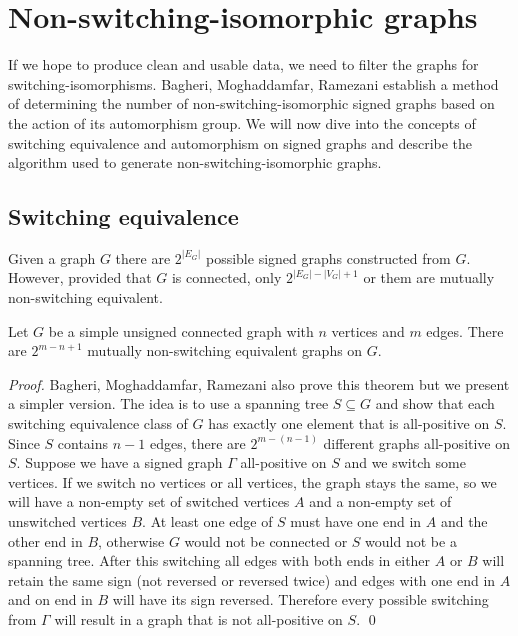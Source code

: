 \chapter{Non-switching-isomorphic graphs}

If we hope to produce clean and usable data, we need to filter the graphs for switching-isomorphisms. Bagheri, Moghaddamfar, Ramezani\cite{switching-isomorphic} establish a method of determining the number of non-switching-isomorphic signed graphs based on the action of its automorphism group. We will now dive into the concepts of switching equivalence and automorphism on signed graphs and describe the algorithm used to generate non-switching-isomorphic graphs.

\section{Switching equivalence}

Given a graph $G$ there are $2^{|E_G|}$ possible signed graphs constructed from $G$. However, provided that $G$ is connected, only $2^{|E_G| - |V_G| + 1}$ or them are mutually non-switching equivalent.

\begin{theorem}\label{lem1:eq-classes}
    Let $G$ be a simple unsigned connected graph with $n$ vertices and $m$ edges. There are $2^{m - n + 1}$ mutually non-switching equivalent graphs on $G$.
\end{theorem}

\textit{Proof.} Bagheri, Moghaddamfar, Ramezani\cite{switching-isomorphic} also prove this theorem but we present a simpler version. The idea is to use a spanning tree $S \subseteq G$ and show that each switching equivalence class of $G$ has exactly one element that is all-positive on $S$. Since $S$ contains $n - 1$ edges, there are $2^{m - (n - 1)}$ different graphs all-positive on $S$. Suppose we have a signed graph $\Gamma$ all-positive on $S$ and we switch some vertices. If we switch no vertices or all vertices, the graph stays the same, so we will have a non-empty set of switched vertices $A$ and a non-empty set of unswitched vertices $B$. At least one edge of $S$ must have one end in $A$ and the other end in $B$, otherwise $G$ would not be connected or $S$ would not be a spanning tree. After this switching all edges with both ends in either $A$ or $B$ will retain the same sign (not reversed or reversed twice) and edges with one end in $A$ and on end in $B$ will have its sign reversed. Therefore every possible switching from $\Gamma$ will result in a graph that is not all-positive on $S$. \qed



